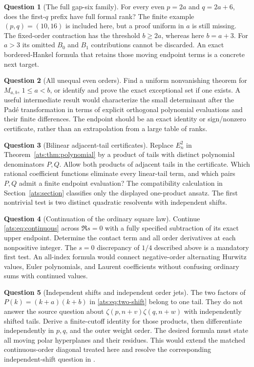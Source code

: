 \documentclass[11pt,a4paper]{article}
\numberwithin{equation}{section}
\theoremstyle{definition}
\newtheorem{question}{Question}
\theoremstyle{remark}
\begin{document}
\begin{question}[The full gap-six family]
For every even $p=2a$ and $q=2a+6$, does the first-$q$ prefix have
full formal rank? The finite example $(p,q)=(10,16)$ is included here,
but a proof uniform in $a$ is still missing. The fixed-order contraction
has the threshold $b\ge2a$, whereas here $b=a+3$. For $a>3$ its
omitted $B_0$ and $B_1$ contributions cannot be discarded. An exact
bordered-Hankel formula that retains those moving endpoint terms is
a concrete next target.
\end{question}

\begin{question}[All unequal even orders]
Find a uniform nonvanishing theorem for $M_{a,b}$, $1\le a<b$,
or identify and prove the exact exceptional set if one exists.
A useful intermediate result would characterize the small determinant
after the Pad\'e transformation in terms of explicit orthogonal
polynomial evaluations and their finite differences. The endpoint
should be an exact identity or sign/nonzero certificate, rather than
an extrapolation from a large table of ranks.
\end{question}

\begin{question}[Bilinear adjacent-tail certificates]
Replace $E_n^2$ in Theorem~\ref{ats:thm:polynomial} by a product of
tails with distinct polynomial denominators $P,Q$. Allow both products
of adjacent tails in the certificate. Which rational coefficient
functions eliminate every linear-tail term, and which pairs $P,Q$
admit a finite endpoint evaluation? The compatibility calculation
in Section~\ref{ats:section} classifies only the displayed one-product
ansatz. The first nontrivial test is two distinct quadratic
resolvents with independent shifts.
\end{question}

\begin{question}[Continuation of the ordinary square law]
Continue \eqref{ats:eq:continuous} across $\Re s=0$ with a fully
specified subtraction of its exact upper endpoint. Determine the
contact term and all order derivatives at each nonpositive integer.
The $s=0$ discrepancy of $1/4$ described above is a mandatory first
test. An all-index formula would connect negative-order alternating
Hurwitz values, Euler polynomials, and Laurent coefficients without
confusing ordinary sums with continued values.
\end{question}

\begin{question}[Independent shifts and independent order jets]
The two factors of $P(k)=(k+a)(k+b)$ in
\eqref{ats:eq:two-shift} belong to one tail. They do not answer the
source question about
$\zeta(p,n+v)\zeta(q,n+w)$ with independently shifted tails.
Derive a finite-cutoff identity for those products, then differentiate
independently in $p,q$, and the outer weight order. The desired formula
must state all moving polar hyperplanes and their residues. This would
extend the matched continuous-order diagonal treated here and resolve
the corresponding independent-shift question in \cite{HTST}.
\end{question}
\end{document}
